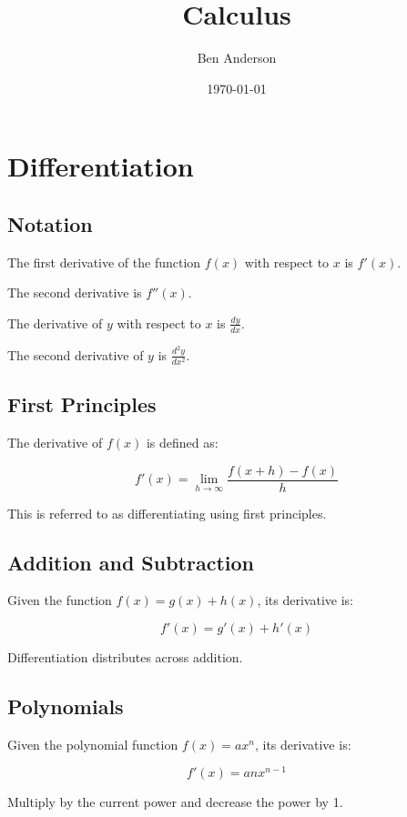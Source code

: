 \documentclass[a4paper,11pt]{article}
\begin{document}
\title{Calculus}
\author{Ben Anderson}
\date{\today}
\maketitle
\pagebreak

\tableofcontents
\pagebreak


\section{Differentiation}

\subsection{Notation}

The first derivative of the function $f(x)$ with respect to $x$ is $f'(x)$.

The second derivative is $f''(x)$.

The derivative of $y$ with respect to $x$ is $\frac{dy}{dx}$.

The second derivative of $y$ is $\frac{d^2y}{dx^2}$.


\subsection{First Principles}

The derivative of $f(x)$ is defined as:

$$
f'(x) = \lim_{h \to \infty} \frac{f(x + h) - f(x)}{h}
$$

This is referred to as differentiating using first principles.


\subsection{Addition and Subtraction}

Given the function $f(x) = g(x) + h(x)$, its derivative is:

$$
f'(x) = g'(x) + h'(x)
$$

Differentiation distributes across addition.


\subsection{Polynomials}

Given the polynomial function $f(x) = ax^n$, its derivative is:

$$
f'(x) = anx^{n - 1}
$$

Multiply by the current power and decrease the power by 1.
\end{document}
